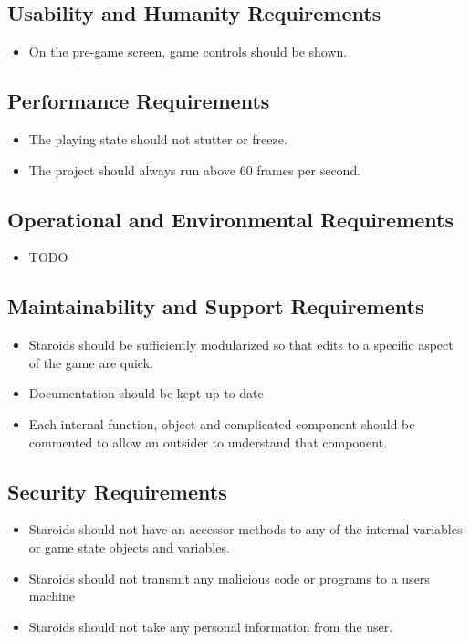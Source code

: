 \documentclass[12pt, titlepage]{article}
\begin{document}
\subsection{Usability and Humanity Requirements}
  \begin{itemize}
    \item On the pre-game screen, game controls should be shown.
  \end{itemize}

\subsection{Performance Requirements}
  \begin{itemize}
    \item The playing state should not stutter or freeze.
    \item The project should always run above 60 frames per second.
  \end{itemize}

\subsection{Operational and Environmental Requirements}
  \begin{itemize}
    \item TODO
  \end{itemize}

\subsection{Maintainability and Support Requirements}
  \begin{itemize}
    \item Staroids should be sufficiently modularized so that edits to a specific aspect of the game are quick.
    \item Documentation should be kept up to date
    \item Each internal function, object and complicated component should be commented to allow an outsider to understand that component.
  \end{itemize}

\subsection{Security Requirements}
  \begin{itemize}
    \item Staroids should not have an accessor methods to any of the internal variables or game state objects and variables.
    \item Staroids should not transmit any malicious code or programs to a users machine
    \item Staroids should not take any personal information from the user.
  \end{itemize}
\end{document}
